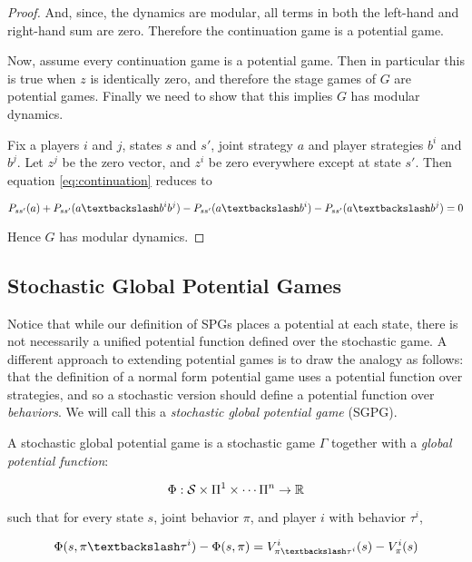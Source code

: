 \begin{thm}
\begin{proof}
And, since, the dynamics are modular, all terms in both the left-hand and right-hand sum are zero. Therefore the continuation game is a potential game. 

Now, assume every continuation game is a potential game. Then in particular this is true when $z$ is identically zero, and therefore the stage games of $G$ are potential games. Finally we need to show that this implies $G$ has modular dynamics. 

Fix a players $i$ and $j$, states $s$ and $s'$, joint strategy $a$ and player strategies $b^i$ and $b^j$. Let $z^j$ be the zero vector, and $z^i$ be zero everywhere except at state $s'$. Then equation \ref{eq:continuation} reduces to

$$
P_{ss'}(a) + P_{ss'}(\asub{a}{b^ib^j}) - P_{ss'}(\asub{a}{b^i}) - P_{ss'}(\asub{a}{b^j}) = 0
$$

Hence $G$ has modular dynamics.

\end{proof}

\label{thm:contmodpg}
\end{thm}



\subsection{Stochastic Global Potential Games}

Notice that while our definition of SPGs places a potential at each state, there is not necessarily a unified potential function defined over the stochastic game. A different approach to extending potential games is to draw the analogy as follows: that the definition of a normal form potential game uses a potential function over strategies, and so a stochastic version should define a potential function over {\em behaviors}. We will call this a {\em stochastic global potential game} (SGPG).

\begin{mydef}
A stochastic global potential game is a stochastic game $\Gamma$ together with a {\em global potential function}:

$$
\Phi: \mathcal{S} \times \Pi^1 \times \cdots \Pi^n \rightarrow \mathbb{R}
$$

such that for every state $s$, joint behavior $\pi$, and player $i$ with behavior $\tau^i$,

$$
\Phi(s, \asub{\pi}{\tau^i}) - \Phi(s, \pi) = V^i_{\asub{\pi}{\tau^i}}(s) - V^i_{\pi}(s)
$$ 

\label{def:sgpg}
\end{mydef}

